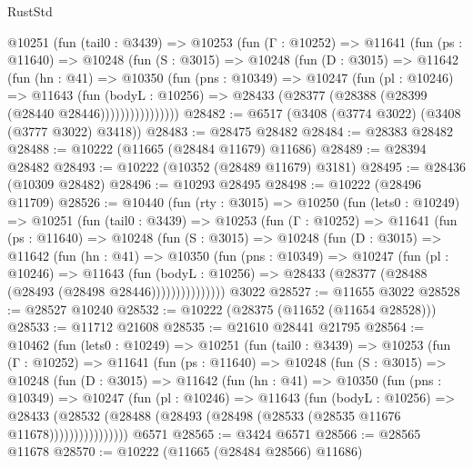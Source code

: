 \begin{lexlean}{RustStd}
\begin{coremodule}
        @10251
          (fun (tail0 : @3439) =>
          @10253
            (fun (Γ : @10252) =>
            @11641
              (fun (ps : @11640) =>
              @10248
                (fun (S : @3015) =>
                @10248
                  (fun (D : @3015) =>
                  @11642
                    (fun (hn : @41) =>
                    @10350
                      (fun (pns : @10349) =>
                      @10247
                        (fun (pl : @10246) =>
                        @11643
                          (fun (bodyL : @10256) =>
                          @28433 (@28377 (@28388 (@28399 (@28440 @28446))))))))))))))))
@28482 := @6517 (@3408 (@3774 @3022) (@3408 (@3777 @3022) @3418))
@28483 := @28475 @28482
@28484 := @28383 @28482
@28488 := @10222 (@11665 (@28484 @11679) @11686)
@28489 := @28394 @28482
@28493 := @10222 (@10352 (@28489 @11679) @3181)
@28495 := @28436 (@10309 @28482)
@28496 := @10293 @28495
@28498 := @10222 (@28496 @11709)
@28526 := @10440
    (fun (rty : @3015) =>
    @10250
      (fun (lets0 : @10249) =>
      @10251
        (fun (tail0 : @3439) =>
        @10253
          (fun (Γ : @10252) =>
          @11641
            (fun (ps : @11640) =>
            @10248
              (fun (S : @3015) =>
              @10248
                (fun (D : @3015) =>
                @11642
                  (fun (hn : @41) =>
                  @10350
                    (fun (pns : @10349) =>
                    @10247
                      (fun (pl : @10246) =>
                      @11643
                        (fun (bodyL : @10256) =>
                        @28433 (@28377 (@28488 (@28493 (@28498 @28446)))))))))))))))
    @3022
@28527 := @11655 @3022
@28528 := @28527 @10240
@28532 := @10222 (@28375 (@11652 (@11654 @28528)))
@28533 := @11712 @21608
@28535 := @21610 @28441 @21795
@28564 := @10462
    (fun (lets0 : @10249) =>
    @10251
      (fun (tail0 : @3439) =>
      @10253
        (fun (Γ : @10252) =>
        @11641
          (fun (ps : @11640) =>
          @10248
            (fun (S : @3015) =>
            @10248
              (fun (D : @3015) =>
              @11642
                (fun (hn : @41) =>
                @10350
                  (fun (pns : @10349) =>
                  @10247
                    (fun (pl : @10246) =>
                    @11643
                      (fun (bodyL : @10256) =>
                      @28433
                        (@28532
                          (@28488 (@28493 (@28498 (@28533 (@28535 @11676 @11678))))))))))))))))
    @6571
@28565 := @3424 @6571
@28566 := @28565 @11678
@28570 := @10222 (@11665 (@28484 @28566) @11686)

\end{coremodule}
\end{lexlean}

